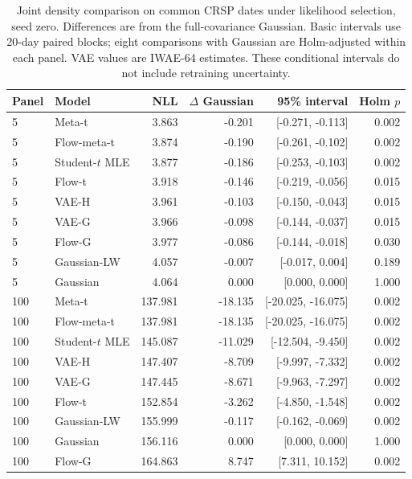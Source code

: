 \documentclass[11pt]{article}
\theoremstyle{definition}\newtheorem{definition}[theorem]{Definition}
\theoremstyle{remark}\newtheorem{remark}[theorem]{Remark}
\begin{document}
\begin{table}[htbp]
\centering\footnotesize
\setlength{\tabcolsep}{4pt}
\begin{tabular}{llrrrr}
\toprule
Panel & Model & NLL & $\Delta$ Gaussian & 95\% interval & Holm $p$ \\
\midrule
5 & Meta-t & 3.863 & -0.201 & [-0.271, -0.113] & 0.002 \\
5 & Flow-meta-t & 3.874 & -0.190 & [-0.261, -0.102] & 0.002 \\
5 & Student-$t$ MLE & 3.877 & -0.186 & [-0.253, -0.103] & 0.002 \\
5 & Flow-t & 3.918 & -0.146 & [-0.219, -0.056] & 0.015 \\
5 & VAE-H & 3.961 & -0.103 & [-0.150, -0.043] & 0.015 \\
5 & VAE-G & 3.966 & -0.098 & [-0.144, -0.037] & 0.015 \\
5 & Flow-G & 3.977 & -0.086 & [-0.144, -0.018] & 0.030 \\
5 & Gaussian-LW & 4.057 & -0.007 & [-0.017, 0.004] & 0.189 \\
5 & Gaussian & 4.064 & 0.000 & [0.000, 0.000] & 1.000 \\
100 & Meta-t & 137.981 & -18.135 & [-20.025, -16.075] & 0.002 \\
100 & Flow-meta-t & 137.981 & -18.135 & [-20.025, -16.075] & 0.002 \\
100 & Student-$t$ MLE & 145.087 & -11.029 & [-12.504, -9.450] & 0.002 \\
100 & VAE-H & 147.407 & -8.709 & [-9.997, -7.332] & 0.002 \\
100 & VAE-G & 147.445 & -8.671 & [-9.963, -7.297] & 0.002 \\
100 & Flow-t & 152.854 & -3.262 & [-4.850, -1.548] & 0.002 \\
100 & Gaussian-LW & 155.999 & -0.117 & [-0.162, -0.069] & 0.002 \\
100 & Gaussian & 156.116 & 0.000 & [0.000, 0.000] & 1.000 \\
100 & Flow-G & 164.863 & 8.747 & [7.311, 10.152] & 0.002 \\
\bottomrule
\end{tabular}
\caption{Joint density comparison on common CRSP dates under likelihood selection, seed zero. Differences are from the full-covariance Gaussian. Basic intervals use 20-day paired blocks; eight comparisons with Gaussian are Holm-adjusted within each panel. VAE values are IWAE-64 estimates. These conditional intervals do not include retraining uncertainty.}\label{tab:r4-density}
\end{table}
\end{document}
